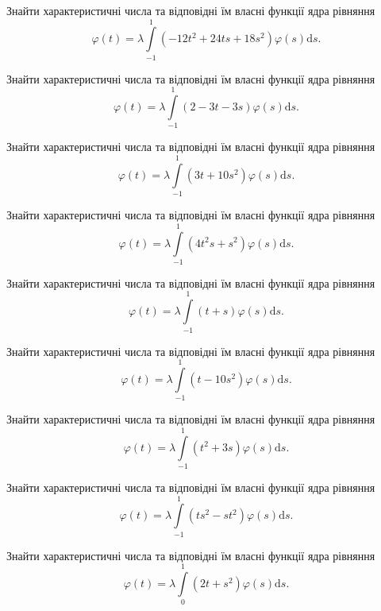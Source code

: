 \documentclass[12pt]{extarticle}
\begin{document}
\begin{Exercise}
Знайти характеристичні числа та відповідні їм власні функції ядра рівняння \[\varphi(t) = \lambda\int\limits_{-1}^{1} (-12 t^2 + 24 ts + 18 s^2) \varphi(s) \mathrm{d}s.\]
\end{Exercise}

\begin{Exercise}
Знайти характеристичні числа та відповідні їм власні функції ядра рівняння \[\varphi(t) = \lambda\int\limits_{-1}^{1} (2-3t -3s) \varphi(s) \mathrm{d}s.\]
\end{Exercise}

\begin{Exercise}
Знайти характеристичні числа та відповідні їм власні функції ядра рівняння \[\varphi(t) = \lambda\int\limits_{-1}^{1} (3t+10s^2) \varphi(s) \mathrm{d}s.\]
\end{Exercise}

\begin{Exercise}
Знайти характеристичні числа та відповідні їм власні функції ядра рівняння \[\varphi(t) = \lambda\int\limits_{-1}^{1} (4t^2 s+s^2) \varphi(s) \mathrm{d}s.\]
\end{Exercise}

\begin{Exercise}
Знайти характеристичні числа та відповідні їм власні функції ядра рівняння \[\varphi(t) = \lambda\int\limits_{-1}^{1} (t+s) \varphi(s) \mathrm{d}s.\]
\end{Exercise}

\begin{Exercise}
Знайти характеристичні числа та відповідні їм власні функції ядра рівняння \[\varphi(t) = \lambda\int\limits_{-1}^{1} (t-10s^2) \varphi(s) \mathrm{d}s.\]
\end{Exercise}

\begin{Exercise}
Знайти характеристичні числа та відповідні їм власні функції ядра рівняння \[\varphi(t) = \lambda\int\limits_{-1}^{1} (t^2+3s) \varphi(s) \mathrm{d}s.\]
\end{Exercise}

\begin{Exercise}
Знайти характеристичні числа та відповідні їм власні функції ядра рівняння \[\varphi(t) = \lambda\int\limits_{-1}^{1} (ts^2-st^2) \varphi(s) \mathrm{d}s.\]
\end{Exercise}

\begin{Exercise}
Знайти характеристичні числа та відповідні їм власні функції ядра рівняння \[\varphi(t) = \lambda\int\limits_{0}^{1} (2t+s^2) \varphi(s) \mathrm{d}s.\]
\end{Exercise}
\end{document}
